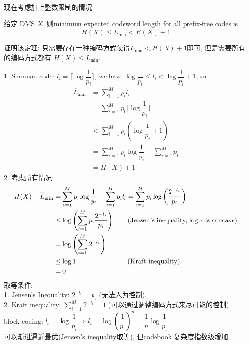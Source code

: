 现在考虑加上整数限制的情况:
\begin{theorem}
给定 DMS $X$, 则minimum expected codeword length for all prefix-free codes is
$$H(X)\leq \overline{L}_{\min}< H(X)+1$$
\end{theorem}
证明该定理: 只需要存在一种编码方式使得$\overline{L}_{\min}<H(X)+1$即可, 但是需要所有的编码方式都有 $H(X)\leq \overline{L}_{\min}$.

1. Shannon code: $l_i=\lceil\log \dfrac{1}{p_i}\rceil$, we have $\log\dfrac{1}{p_i}\leq l_i < \log\dfrac{1}{p_i}+1$, so
\begin{align*}
\overline{L}_{\min} &= \sum_{i=1}^M p_i l_i \\
&= \sum_{i=1}^M p_i \lceil\log \dfrac{1}{p_i}\rceil \\
&< \sum_{i=1}^M p_i \left(\log \dfrac{1}{p_i}+1\right) \\
&= \sum_{i=1}^M p_i \log \dfrac{1}{p_i} + \sum_{i=1}^M p_i \\
&= H(X)+1
\end{align*}
2. 考虑所有情况:
\begin{align*}
H(X) - \overline{L}_{\min} &= \sum_{i=1}^M p_i \log \dfrac{1}{p_i} - \sum_{i=1}^M p_i l_i = \sum_{i=1}^M p_i \log \left(\dfrac{2^{-l_i}}{p_i}\right) \\
&\leq \log\left(\sum_{i=1}^M p_i \dfrac{2^{-l_i}}{p_i}\right) \text{\qquad (Jensen's inequality, $\log x$ is concave)} \\
&= \log\left(\sum_{i=1}^M2^{-l_i}\right) \\
&\leq \log 1 \text{\qquad\qquad\qquad\quad\ \ (Kraft inequality)} \\
&= 0
\end{align*}
取等条件: \\
1. Jensen's Inequality: $2^{-l_i}=p_i$ (无法人为控制). \\
2. Kraft inequality: $\sum\limits_{i=1}^M2^{-l_i}=1$ (可以通过调整编码方式来尽可能的控制). \\
block-coding: $l_i=\log\dfrac{1}{p_i}\Rightarrow l_i=\log\left(\dfrac{1}{p_i}\right)^n=\dfrac{1}{n}\log\dfrac{1}{p_i}$ \\
可以渐进逼近最优(Jensen's inequality取等), 但codebook 复杂度指数级增加.